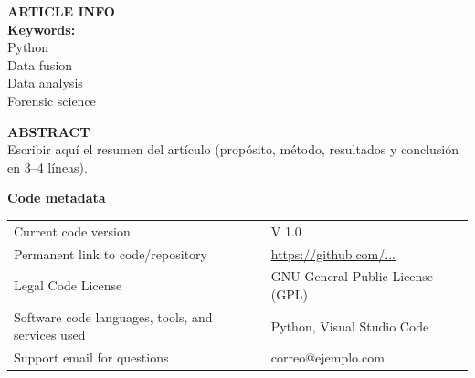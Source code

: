 
\maketitle

\noindent
\begin{minipage}[t]{0.30\textwidth}
  \textbf{ARTICLE INFO}\\[3mm]
  \textbf{Keywords:}\\
  Python\\
  Data fusion\\
  Data analysis\\
  Forensic science
\end{minipage}%
\hfill
\begin{minipage}[t]{0.66\textwidth}
  \textbf{ABSTRACT}\\[3mm]
  Escribir aquí el resumen del artículo (propósito, método, resultados y conclusión en 3--4 líneas).
\end{minipage}

\vspace{5mm}

\textbf{Code metadata}

\begin{tabular}{@{} >{\raggedright\arraybackslash}p{} >{\raggedright\arraybackslash}p{} @{}}
\toprule
Current code version & V 1.0 \\
Permanent link to code/repository & \url{https://github.com/...} \\
Legal Code License & GNU General Public License (GPL) \\
Software code languages, tools, and services used & Python, Visual Studio Code \\
Support email for questions & correo@ejemplo.com \\
\bottomrule
\end{tabular}
